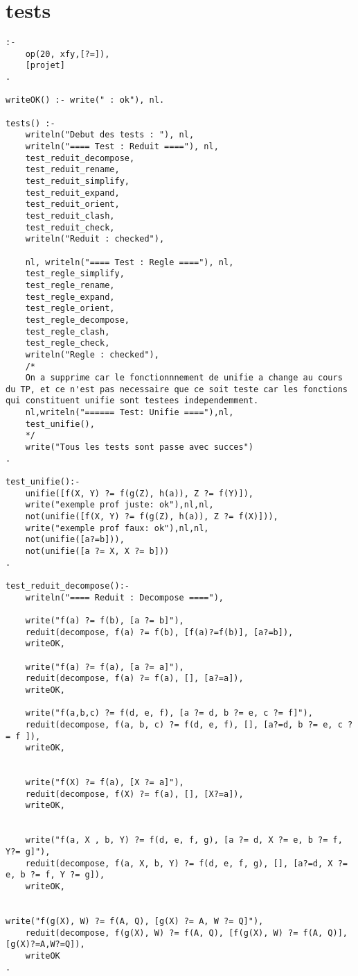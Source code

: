 \documentclass[10pt,a4paper]{report}
\begin{document}
\section{tests}
\begin{lstlisting}[caption ={le fichier test.pl}]
:-
	op(20, xfy,[?=]),
	[projet]
.

writeOK() :- write(" : ok"), nl.

tests() :-
	writeln("Debut des tests : "), nl,
	writeln("==== Test : Reduit ===="), nl,
	test_reduit_decompose,
	test_reduit_rename,
	test_reduit_simplify,
	test_reduit_expand,
	test_reduit_orient,
	test_reduit_clash,
	test_reduit_check,
	writeln("Reduit : checked"),

	nl, writeln("==== Test : Regle ===="), nl,
	test_regle_simplify,
	test_regle_rename,
	test_regle_expand,
	test_regle_orient,
	test_regle_decompose,
	test_regle_clash,
	test_regle_check,
	writeln("Regle : checked"),
	/*
	On a supprime car le fonctionnnement de unifie a change au cours du TP, et ce n'est pas necessaire que ce soit teste car les fonctions qui constituent unifie sont testees independemment.
	nl,writeln("====== Test: Unifie ===="),nl,
	test_unifie(),
	*/
	write("Tous les tests sont passe avec succes")
.

test_unifie():-
	unifie([f(X, Y) ?= f(g(Z), h(a)), Z ?= f(Y)]),
	write("exemple prof juste: ok"),nl,nl,
	not(unifie([f(X, Y) ?= f(g(Z), h(a)), Z ?= f(X)])),
	write("exemple prof faux: ok"),nl,nl,
	not(unifie([a?=b])),
	not(unifie([a ?= X, X ?= b]))
.

test_reduit_decompose():-
	writeln("==== Reduit : Decompose ===="),

	write("f(a) ?= f(b), [a ?= b]"),
	reduit(decompose, f(a) ?= f(b), [f(a)?=f(b)], [a?=b]),
	writeOK,
	
	write("f(a) ?= f(a), [a ?= a]"), 
	reduit(decompose, f(a) ?= f(a), [], [a?=a]),
	writeOK,

	write("f(a,b,c) ?= f(d, e, f), [a ?= d, b ?= e, c ?= f]"), 
	reduit(decompose, f(a, b, c) ?= f(d, e, f), [], [a?=d, b ?= e, c ?= f ]),
	writeOK,


	write("f(X) ?= f(a), [X ?= a]"), 
	reduit(decompose, f(X) ?= f(a), [], [X?=a]),
	writeOK,


	write("f(a, X , b, Y) ?= f(d, e, f, g), [a ?= d, X ?= e, b ?= f, Y?= g]"), 
	reduit(decompose, f(a, X, b, Y) ?= f(d, e, f, g), [], [a?=d, X ?= e, b ?= f, Y ?= g]),
	writeOK,


write("f(g(X), W) ?= f(A, Q), [g(X) ?= A, W ?= Q]"),
	reduit(decompose, f(g(X), W) ?= f(A, Q), [f(g(X), W) ?= f(A, Q)], [g(X)?=A,W?=Q]),
	writeOK
.


\end{lstlisting}
\end{document}
